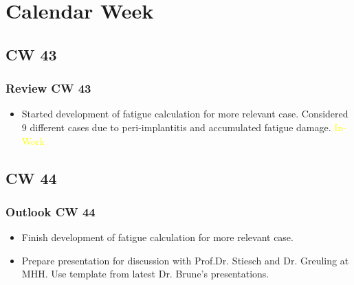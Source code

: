 \section{Calendar Week}
\subsection{CW 43}
\begin{frame}
  \frametitle{Review CW 43}
	\begin{itemize}
		\item Started development of fatigue calculation for more relevant case. Considered 9 different cases due to peri-implantitis and accumulated fatigue damage. \textcolor{yellow}{In-Work}
	\end{itemize}
\end{frame}


\subsection{CW 44}
\begin{frame}
  \frametitle{Outlook CW 44}
	\begin{itemize}
		\item Finish development of fatigue calculation for more relevant case.
		\item Prepare presentation for discussion with Prof.Dr. Stiesch and Dr. Greuling at MHH. Use template from latest Dr. Brune's presentations.
	\end{itemize}
\end{frame}

